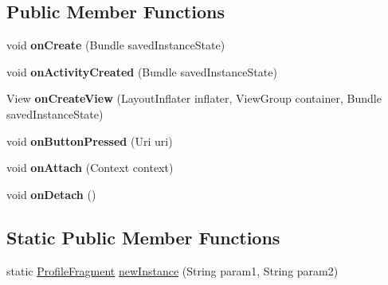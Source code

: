 \subsection*{Public Member Functions}
\begin{DoxyCompactItemize}
\item 
void {\bfseries on\+Create} (Bundle saved\+Instance\+State)\hypertarget{classcom_1_1example_1_1sel_1_1lostfound_1_1ProfileFragment_a52a51c0a57347d86da5de367f715076f}{}\label{classcom_1_1example_1_1sel_1_1lostfound_1_1ProfileFragment_a52a51c0a57347d86da5de367f715076f}

\item 
void {\bfseries on\+Activity\+Created} (Bundle saved\+Instance\+State)\hypertarget{classcom_1_1example_1_1sel_1_1lostfound_1_1ProfileFragment_a1930f4c070b5d7a4204422f4e0ddc35f}{}\label{classcom_1_1example_1_1sel_1_1lostfound_1_1ProfileFragment_a1930f4c070b5d7a4204422f4e0ddc35f}

\item 
View {\bfseries on\+Create\+View} (Layout\+Inflater inflater, View\+Group container, Bundle saved\+Instance\+State)\hypertarget{classcom_1_1example_1_1sel_1_1lostfound_1_1ProfileFragment_a7bb29240ea89cc1f9c5539dd9117765e}{}\label{classcom_1_1example_1_1sel_1_1lostfound_1_1ProfileFragment_a7bb29240ea89cc1f9c5539dd9117765e}

\item 
void {\bfseries on\+Button\+Pressed} (Uri uri)\hypertarget{classcom_1_1example_1_1sel_1_1lostfound_1_1ProfileFragment_a5d06af34470ca3d940361d9315cd98fb}{}\label{classcom_1_1example_1_1sel_1_1lostfound_1_1ProfileFragment_a5d06af34470ca3d940361d9315cd98fb}

\item 
void {\bfseries on\+Attach} (Context context)\hypertarget{classcom_1_1example_1_1sel_1_1lostfound_1_1ProfileFragment_a22ef41a710d02636086eb5b6b01a2e1e}{}\label{classcom_1_1example_1_1sel_1_1lostfound_1_1ProfileFragment_a22ef41a710d02636086eb5b6b01a2e1e}

\item 
void {\bfseries on\+Detach} ()\hypertarget{classcom_1_1example_1_1sel_1_1lostfound_1_1ProfileFragment_a922ba5757676d5642082baaed332dfb1}{}\label{classcom_1_1example_1_1sel_1_1lostfound_1_1ProfileFragment_a922ba5757676d5642082baaed332dfb1}

\end{DoxyCompactItemize}
\subsection*{Static Public Member Functions}
\begin{DoxyCompactItemize}
\item 
static \hyperlink{classcom_1_1example_1_1sel_1_1lostfound_1_1ProfileFragment}{Profile\+Fragment} \hyperlink{classcom_1_1example_1_1sel_1_1lostfound_1_1ProfileFragment_a2a0246ef59fbd7dd833eb7db772302c6}{new\+Instance} (String param1, String param2)
\end{DoxyCompactItemize}


